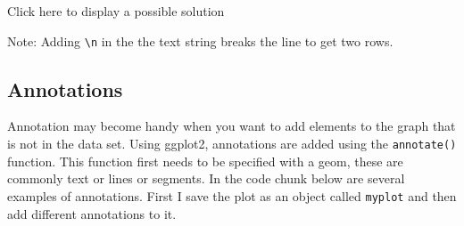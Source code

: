 \documentclass[
  11pt,
  letterpaper,
]{scrbook}
\newenvironment{Shaded}{\begin{snugshade}}{\end{snugshade}}
\newcommand{\AttributeTok}[1]{\textcolor[rgb]{0.40,0.45,0.13}{#1}}
\newcommand{\CommentTok}[1]{\textcolor[rgb]{0.37,0.37,0.37}{#1}}
\newcommand{\FunctionTok}[1]{\textcolor[rgb]{0.28,0.35,0.67}{#1}}
\newcommand{\NormalTok}[1]{\textcolor[rgb]{0.00,0.23,0.31}{#1}}
\newcommand{\OtherTok}[1]{\textcolor[rgb]{0.00,0.23,0.31}{#1}}
\newcommand{\SpecialCharTok}[1]{\textcolor[rgb]{0.37,0.37,0.37}{#1}}
\newcommand{\StringTok}[1]{\textcolor[rgb]{0.13,0.47,0.30}{#1}}
\begin{document}
Click here to display a possible solution

\hypertarget{toggleText1}{}
\begin{Shaded}
\end{Shaded}

Note: Adding \texttt{\textbackslash{}n} in the the text string breaks
the line to get two rows.

\hypertarget{annotations}{%
\subsection{Annotations}\label{annotations}}

Annotation may become handy when you want to add elements to the graph
that is not in the data set. Using ggplot2, annotations are added using
the \texttt{annotate()} function. This function first needs to be
specified with a geom, these are commonly text or lines or segments. In
the code chunk below are several examples of annotations. First I save
the plot as an object called \texttt{myplot} and then add different
annotations to it.
\end{document}
